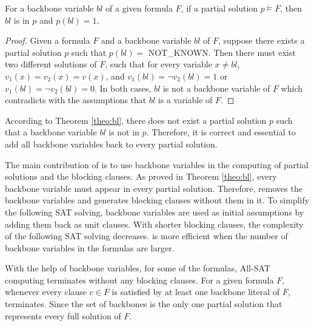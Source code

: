 \begin{theorem} \label{theo:bl}
For a backbone variable $bl$ of a given formula $F$, if a partial solution $p\models F$, then $bl$ is in $p$ and $p(bl)=1$.
\end{theorem}

\begin{proof}
Given a formula $F$ and a backbone variable $bl$ of $F$, suppose there exists a partial solution $p$ such that $p(bl)=$ NOT\_KNOWN. Then there must exist two different solutions of $F$, such that for every variable $x\neq bl$, $v_1(x)=v_2(x)=v(x)$, and $v_1(bl)=\neg v_2(bl)=1$ or $v_1(bl)=\neg v_2(bl)=0$. In both cases, $bl$ is not a backbone variable of $F$ which contradicts with the assumptions that $bl$ is a variable of $F$.
\end{proof}
According to Theorem \ref{theo:bl}, there does not exist a partial solution $p$ such that a backbone variable $bl$ is not in $p$. Therefore, it is correct and essential to add all backbone variables back to every partial solution.

The main contribution of \tool is to use backbone variables in the computing of partial solutions and the blocking clauses. As proved in Theorem \ref{theo:bl}, every backbone variable must appear in every partial solution. Therefore, \tool removes the backbone variables and generates blocking clauses without them in it. To simplify the following SAT solving, backbone variables are used as initial assumptions by adding them back as unit clauses. With shorter blocking clauses, the complexity of the following SAT solving decreases. \tool is more efficient when the number of backbone variables in the formulas are larger. 

With the help of backbone variables, for some of the formulas, All-SAT computing terminates without any blocking clauses.
For a given formula $F$, whenever every clause $c\in F$ is satisfied by at least one backbone literal of $F$, \tool terminates. Since the set of backbones is the only one partial solution that represents every full solution of $F$.

